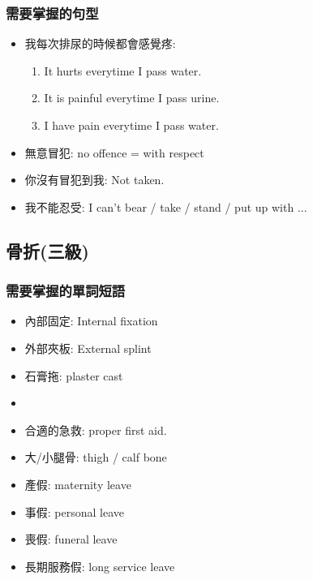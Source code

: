 \subsubsection*{需要掌握的句型}
\begin{multicols}{2}
\begin{itemize}
  \itemsep0em
  \item 我每次排尿的時候都會感覺疼:
  \begin{enumerate}
    \itemsep0em
    \item It hurts everytime I pass water.
    \item It is painful everytime I pass urine. 
    \item I have pain everytime I pass water.
  \end{enumerate}
  \item 無意冒犯: no offence = with respect
  \item 你沒有冒犯到我: Not taken.
  \item 我不能忍受: I can't bear / take / stand / put up with ...
\end{itemize}
\end{multicols}

\subsection{骨折(三級)}
\subsubsection*{需要掌握的單詞短語}
\begin{multicols}{2}
\begin{itemize}
  \itemsep0em
  \item 內部固定: Internal fixation
  \item 外部夾板: External splint
  \item 石膏拖: plaster cast
  \item {}
  \item 合適的急救: proper first aid.
  \item 大/小腿骨: thigh / calf bone
  \item 產假: maternity leave
  \item 事假: personal leave
  \item 喪假: funeral leave
  \item 長期服務假: long service leave
\end{itemize}
\end{multicols}


